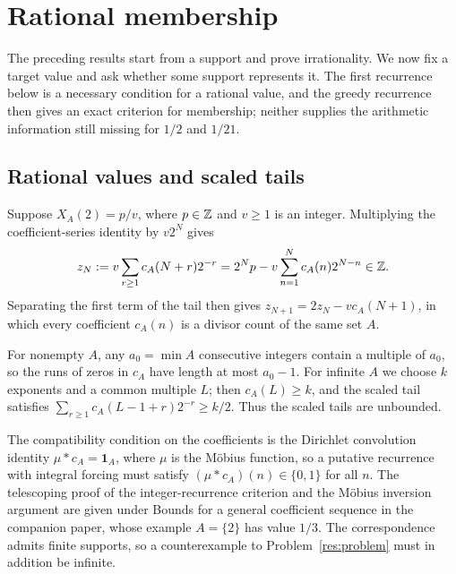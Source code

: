 \documentclass[11pt]{article}
\begin{document}
\section{Rational membership}\label{sec:rational-membership}
The preceding results start from a support and prove irrationality. We
now fix a target value and ask whether some support represents it. The
first recurrence below is a necessary condition for a rational value,
and the greedy recurrence then gives an exact criterion for membership;
neither supplies the arithmetic information still missing for $1/2$ and
$1/21$.

\subsection{Rational values and scaled tails}\label{sec:forced}
Suppose $X_A(2)=p/v$, where $p\in\mathbb{Z}$ and $v\ge1$ is an integer.
Multiplying the coefficient-series identity by $v2^N$ gives
\[
 z_N:=v\sum_{r\ge1}c_A(N+r)2^{-r}
     =2^Np-v\sum_{n=1}^{N}c_A(n)2^{N-n}\in\mathbb{Z}.
\]
Separating the first term of the tail then gives
$z_{N+1}=2z_N-vc_A(N+1)$, in which every coefficient $c_A(n)$ is a
divisor count of the same set $A$.

For nonempty $A$, any $a_0=\min A$ consecutive integers contain a
multiple of $a_0$, so the runs of zeros in $c_A$ have length at most
$a_0-1$. For infinite $A$ we choose $k$ exponents and a common multiple
$L$; then $c_A(L)\ge k$, and the scaled tail satisfies
$\sum_{r\ge1}c_A(L-1+r)2^{-r}\ge k/2$. Thus the scaled tails are
unbounded.

The compatibility condition on the coefficients is the Dirichlet
convolution identity $\mu*c_A=\mathbf1_A$, where $\mu$ is the
M\"obius function, so a putative recurrence with integral forcing must
satisfy $(\mu*c_A)(n)\in\{0,1\}$ for all $n$. The telescoping proof of
the integer-recurrence criterion and the M\"obius inversion argument
are given under
{Bounds for a general coefficient sequence} in the companion paper,
whose example $A=\{2\}$ has value $1/3$. The correspondence admits
finite supports, so a counterexample to Problem~\ref{res:problem} must
in addition be infinite.
\end{document}
